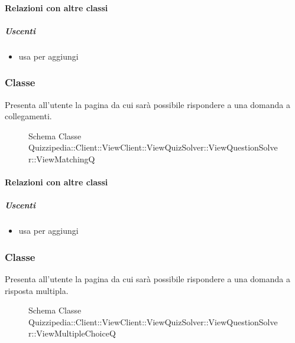 \paragraph{Relazioni con altre classi}
\subparagraph{Uscenti}
\begin{itemize}
\item usa  per aggiungi
\end{itemize}
\subsubsection{Classe }
Presenta all'utente la pagina da cui sarà possibile rispondere a una domanda a collegamenti.
\begin{figure}[H]
\centering
\noindent{}
\caption[Schema Classe ViewMatchingQ]{Schema Classe Quizzipedia::Client::ViewClient::ViewQuizSolver::ViewQuestionSolver::ViewMatchingQ}
\end{figure}
\paragraph{Relazioni con altre classi}
\subparagraph{Uscenti}
\begin{itemize}
\item usa  per aggiungi
\end{itemize}
\subsubsection{Classe }
Presenta all'utente la pagina da cui sarà possibile rispondere a una domanda a risposta multipla.
\begin{figure}[H]
\centering
\noindent{}
\caption[Schema Classe ViewMultipleChoiceQ]{Schema Classe Quizzipedia::Client::ViewClient::ViewQuizSolver::ViewQuestionSolver::ViewMultipleChoiceQ}
\end{figure}
